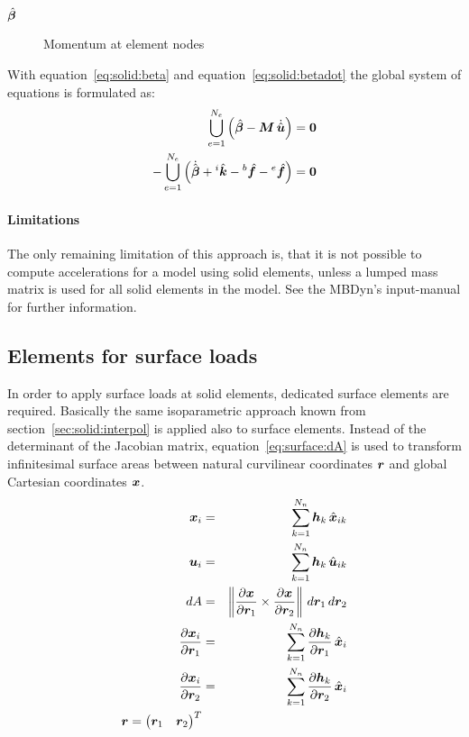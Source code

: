 \begin{description}
\item[$\hat{\bm{\beta}}$] Momentum at element nodes
\end{description}

With equation~\ref{eq:solid:beta} and equation~\ref{eq:solid:betadot} the global system of equations is formulated as:
\begin{eqnarray}
\bigcup_{e=1}^{N_e} \left(\hat{\bm{\beta}} - \bm{M} \, \dot{\hat{\bm{u}}}\right) = \bm{0} \\
-\bigcup_{e=1}^{N_e} \left(\dot{\hat{\bm{\beta}}} + {^i}\hat{\bm{k}} - {^b}\hat{\bm{f}} - {^e}\hat{\bm{f}}\right) = \bm{0}
\end{eqnarray}

\paragraph{Limitations}
The only remaining limitation of this approach is, that it is not possible to compute accelerations
for a model using solid elements, unless a lumped mass matrix is used for all solid elements in the model.
See the MBDyn's input-manual for further information.

\subsection{Elements for surface loads}
In order to apply surface loads at solid elements, dedicated surface elements are required.
Basically the same isoparametric approach known from section~\ref{sec:solid:interpol} is applied also to surface elements.
Instead of the determinant of the Jacobian matrix, equation~\ref{eq:surface:dA} is used to transform infinitesimal surface areas
between natural curvilinear coordinates $\bm{r}$ and global Cartesian coordinates $\bm{x}$.
\begin{eqnarray}
\bm{x}_i & = & \sum_{k=1}^{N_n} \bm{h}_k \, \hat{\bm{x}}_{ik} \\
\bm{u}_i & = & \sum_{k=1}^{N_n} \bm{h}_k \, \hat{\bm{u}}_{ik} \\
dA & = & \left\Vert\frac{\partial \bm{x}}{\partial \bm{r}_1} \times \frac{\partial \bm{x}}{\partial \bm{r}_2} \right\Vert \,d\bm{r}_1 \, d\bm{r}_2 \label{eq:surface:dA} \\
\frac{\partial \bm{x}_i}{\partial \bm{r}_1} & = &\sum_{k=1}^{N_n} \frac{\partial \bm{h}_{k}}{\partial \bm{r}_1} \, \hat{\bm{x}}_i \\
\frac{\partial \bm{x}_i}{\partial \bm{r}_2} & = &\sum_{k=1}^{N_n} \frac{\partial \bm{h}_{k}}{\partial \bm{r}_2} \, \hat{\bm{x}}_i \\
\bm{r}=\begin{pmatrix} \bm{r}_1 & \bm{r}_2 \end{pmatrix}^T
\end{eqnarray}
